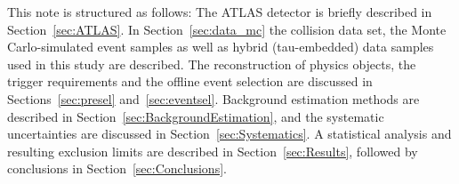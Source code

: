 This note is structured as follows: The ATLAS detector is briefly
described in Section~\ref{sec:ATLAS}. In Section~\ref{sec:data_mc} the
collision data set, the Monte Carlo-simulated event samples as well as
hybrid (tau-embedded) data samples used in this study are
described. The reconstruction of physics objects, the trigger
requirements and the offline event selection are discussed in
Sections~\ref{sec:presel} and~\ref{sec:eventsel}. Background estimation methods are
described in Section~\ref{sec:BackgroundEstimation}, and the
systematic uncertainties are discussed in
Section~\ref{sec:Systematics}. A statistical analysis and resulting
exclusion limits are described in Section~\ref{sec:Results}, followed
by conclusions in Section~\ref{sec:Conclusions}.

